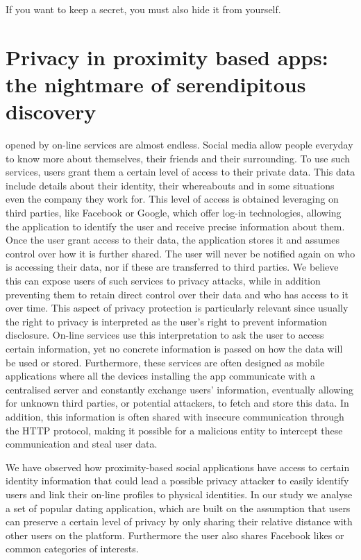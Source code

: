 \begin{savequote}[75mm]
If you want to keep a secret, you must also hide it from yourself.
\end{savequote}

\chapter{Privacy in proximity based apps: the nightmare of serendipitous discovery}

 opened by on-line services are almost endless. Social media allow people everyday to know more about themselves, their friends and their surrounding. To use such services, users grant them a certain level of access to their private data. This data include details about their identity, their whereabouts and in some situations even the company they work for. This level of access is obtained leveraging on third parties, like Facebook or Google, which offer log-in technologies, allowing the application to identify the user and receive precise information about them.
Once the user grant access to their data, the application stores it and assumes control over how it is further shared. The user will never be notified again on who is accessing their data, nor if these are transferred to third parties.
We believe this can expose users of such services to privacy attacks, while in addition preventing them to retain direct control over their data and who has access to it over time.
This aspect of privacy protection is particularly relevant since usually the right to privacy is interpreted as the user's right to prevent information disclosure. On-line services use this interpretation to ask the user to access certain information, yet no concrete information is passed on how the data will be used or stored. Furthermore, these services are often designed as mobile applications where all the devices installing the app communicate with a centralised server and constantly exchange users' information, eventually allowing for unknown third parties, or potential attackers, to fetch and store this data. In addition, this information is often shared with insecure communication through the HTTP protocol, making it possible for a malicious entity to intercept these communication and steal user data.

We have observed how proximity-based social applications have access to certain identity information that could lead a possible privacy attacker to easily identify users and link their on-line profiles to physical identities. In our study we analyse a set of popular dating application, which are built on the assumption that users can preserve a certain level of privacy by only sharing their relative distance with other users on the platform. Furthermore the user also shares Facebook likes or common categories of interests.

